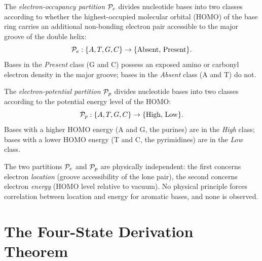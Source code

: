 \begin{definition}
\label{def:occupancy_partition}
The \emph{electron-occupancy partition} $\mathcal{P}_e$ divides nucleotide bases
into two classes according to whether the highest-occupied molecular orbital
(HOMO) of the base ring carries an additional non-bonding electron pair
accessible to the major groove of the double helix:
\begin{equation}
  \mathcal{P}_e: \{A, T, G, C\} \to \{\mathrm{Absent},\, \mathrm{Present}\}.
\end{equation}
Bases in the \emph{Present} class (G and C) possess an exposed amino or
carbonyl electron density in the major groove; bases in the \emph{Absent}
class (A and T) do not.
\end{definition}

\begin{definition}
\label{def:potential_partition}
The \emph{electron-potential partition} $\mathcal{P}_p$ divides nucleotide bases
into two classes according to the potential energy level of the HOMO:
\begin{equation}
  \mathcal{P}_p: \{A, T, G, C\} \to \{\mathrm{High},\, \mathrm{Low}\}.
\end{equation}
Bases with a higher HOMO energy (A and G, the purines) are in the
\emph{High} class; bases with a lower HOMO energy (T and C, the pyrimidines)
are in the \emph{Low} class.
\end{definition}

\begin{remark}
The two partitions $\mathcal{P}_e$ and $\mathcal{P}_p$ are physically independent:
the first concerns electron \emph{location} (groove accessibility of the
lone pair), the second concerns electron \emph{energy} (HOMO level relative
to vacuum). No physical principle forces correlation between location and
energy for aromatic bases, and none is observed.
\end{remark}

\section{The Four-State Derivation Theorem}
\label{sec:four_state_theorem}

